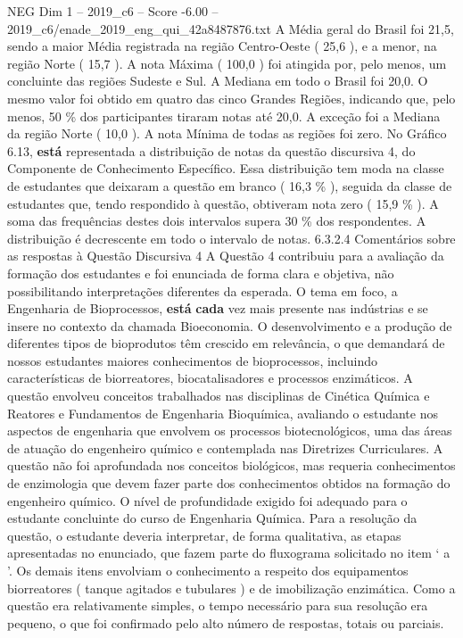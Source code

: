 \begin{textsample}{NEG Dim 1 – 2019\_c6 – Score -6.00 – 2019\_c6/enade\_2019\_eng\_qui\_42a8487876.txt}
A Média geral do Brasil foi 21,5, sendo a maior Média registrada na região Centro-Oeste ( 25,6 ), e a menor, na região Norte ( 15,7 ).
A nota Máxima ( 100,0 ) foi atingida por, pelo menos, um concluinte das regiões Sudeste e Sul.
A Mediana em todo o Brasil foi 20,0.
O mesmo valor foi obtido em quatro das cinco Grandes Regiões, indicando que, pelo menos, 50 \% dos participantes tiraram notas até 20,0.
A exceção foi a Mediana da região Norte ( 10,0 ).
A nota Mínima de todas as regiões foi zero.
No Gráfico 6.13, \textbf{está} representada a distribuição de notas da questão discursiva 4, do Componente de Conhecimento Específico.
Essa distribuição tem moda na classe de estudantes que deixaram a questão em branco ( 16,3 \% ), seguida da classe de estudantes que, tendo respondido à questão, obtiveram nota zero ( 15,9 \% ).
A soma das frequências destes dois intervalos supera 30 \% dos respondentes.
A distribuição é decrescente em todo o intervalo de notas. 6.3.2.4 Comentários sobre as respostas à Questão Discursiva 4 A Questão 4 contribuiu para a avaliação da formação dos estudantes e foi enunciada de forma clara e objetiva, não possibilitando interpretações diferentes da esperada.
O tema em foco, a Engenharia de Bioprocessos, \textbf{está} \textbf{cada} vez mais presente nas indústrias e se insere no contexto da chamada Bioeconomia.
O desenvolvimento e a produção de diferentes tipos de bioprodutos têm crescido em relevância, o que demandará de nossos estudantes maiores conhecimentos de bioprocessos, incluindo características de biorreatores, biocatalisadores e processos enzimáticos.
A questão envolveu conceitos trabalhados nas disciplinas de Cinética Química e Reatores e Fundamentos de Engenharia Bioquímica, avaliando o estudante nos aspectos de engenharia que envolvem os processos biotecnológicos, uma das áreas de atuação do engenheiro químico e contemplada nas Diretrizes Curriculares.
A questão não foi aprofundada nos conceitos biológicos, mas requeria conhecimentos de enzimologia que devem fazer parte dos conhecimentos obtidos na formação do engenheiro químico.
O nível de profundidade exigido foi adequado para o estudante concluinte do curso de Engenharia Química.
Para a resolução da questão, o estudante deveria interpretar, de forma qualitativa, as etapas apresentadas no enunciado, que fazem parte do fluxograma solicitado no item ‘ a ’.
Os demais itens envolviam o conhecimento a respeito dos equipamentos biorreatores ( tanque agitados e tubulares ) e de imobilização enzimática.
Como a questão era relativamente simples, o tempo necessário para sua resolução era pequeno, o que foi confirmado pelo alto número de respostas, totais ou parciais.

\end{textsample}
